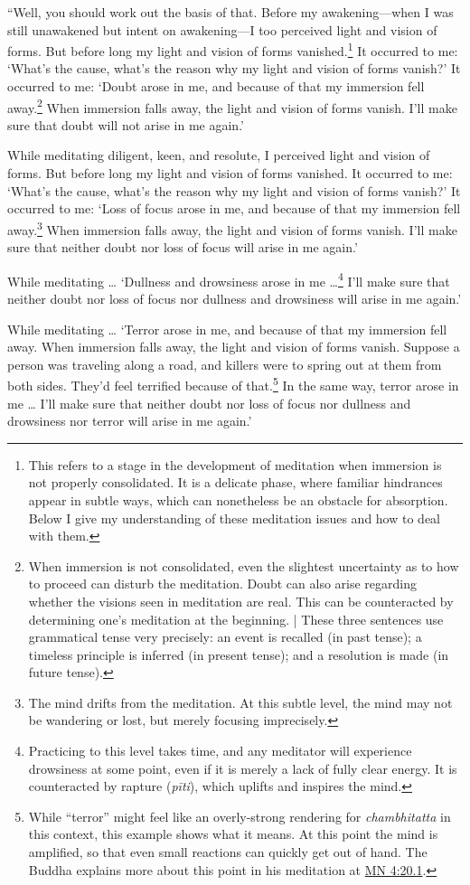 \documentclass[12pt,openany]{book}%
\begin{document}
“Well, you should work out the basis of that. Before my awakening—when I was still unawakened but intent on awakening—I too perceived light and vision of forms. But before long my light and vision of forms vanished.\footnote{This refers to a stage in the development of meditation when immersion is not properly consolidated. It is a delicate phase, where familiar hindrances appear in subtle ways, which can nonetheless be an obstacle for absorption. Below I give my understanding of these meditation issues and how to deal with them. } It occurred to me: ‘What’s the cause, what’s the reason why my light and vision of forms vanish?’ It occurred to me: ‘Doubt arose in me, and because of that my immersion fell away.\footnote{When immersion is not consolidated, even the slightest uncertainty as to how to proceed can disturb the meditation. Doubt can also arise regarding whether the visions seen in meditation are real. This can be counteracted by determining one’s meditation at the beginning. | These three sentences use grammatical tense very precisely: an event is recalled (in past tense); a timeless principle is inferred (in present tense); and a resolution is made (in future tense). } When immersion falls away, the light and vision of forms vanish. I’ll make sure that doubt will not arise in me again.’ 

While meditating diligent, keen, and resolute, I perceived light and vision of forms. But before long my light and vision of forms vanished. It occurred to me: ‘What’s the cause, what’s the reason why my light and vision of forms vanish?’ It occurred to me: ‘Loss of focus arose in me, and because of that my immersion fell away.\footnote{The mind drifts from the meditation. At this subtle level, the mind may not be wandering or lost, but merely focusing imprecisely. } When immersion falls away, the light and vision of forms vanish. I’ll make sure that neither doubt nor loss of focus will arise in me again.’ 

While meditating … ‘Dullness and drowsiness arose in me …\footnote{Practicing to this level takes time, and any meditator will experience drowsiness at some point, even if it is merely a lack of fully clear energy. It is counteracted by rapture (\textit{\textsanskrit{pīti}}), which uplifts and inspires the mind. } I’ll make sure that neither doubt nor loss of focus nor dullness and drowsiness will arise in me again.’ 

While meditating … ‘Terror arose in me, and because of that my immersion fell away. When immersion falls away, the light and vision of forms vanish. Suppose a person was traveling along a road, and killers were to spring out at them from both sides. They’d feel terrified because of that.\footnote{While “terror” might feel like an overly-strong rendering for \textit{chambhitatta} in this context, this example shows what it means. At this point the mind is amplified, so that even small reactions can quickly get out of hand. The Buddha explains more about this point in his meditation at \href{https://suttacentral.net/mn4/en/sujato\#20.1}{MN 4:20.1}. } In the same way, terror arose in me … I’ll make sure that neither doubt nor loss of focus nor dullness and drowsiness nor terror will arise in me again.’ 
\end{document}
